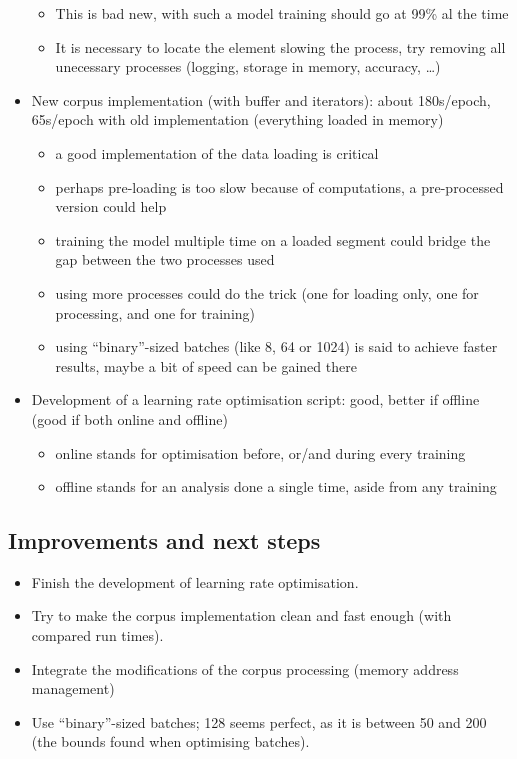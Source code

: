 \begin{itemize}
  \begin{itemize}
  \item
    This is bad new, with such a model training should go at 99\% al the
    time
  \item
    It is necessary to locate the element slowing the process, try
    removing all unecessary processes (logging, storage in memory,
    accuracy, \ldots{})
  \end{itemize}
\item
  New corpus implementation (with buffer and iterators): about
  180s/epoch, 65s/epoch with old implementation (everything loaded in
  memory)

  \begin{itemize}
  \item
    a good implementation of the data loading is critical
  \item
    perhaps pre-loading is too slow because of computations, a
    pre-processed version could help
  \item
    training the model multiple time on a loaded segment could bridge
    the gap between the two processes used
  \item
    using more processes could do the trick (one for loading only, one
    for processing, and one for training)
  \item
    using ``binary''-sized batches (like 8, 64 or 1024) is said to
    achieve faster results, maybe a bit of speed can be gained there
  \end{itemize}
\item
  Development of a learning rate optimisation script: good, better if
  offline (good if both online and offline)

  \begin{itemize}
  \item
    online stands for optimisation before, or/and during every training
  \item
    offline stands for an analysis done a single time, aside from any
    training
  \end{itemize}
\end{itemize}

\subsection{Improvements and next
steps}

\begin{itemize}
\item
  Finish the development of learning rate optimisation.
\item
  Try to make the corpus implementation clean and fast enough (with
  compared run times).
\item
  Integrate the modifications of the corpus processing (memory address
  management)
\item
  Use ``binary''-sized batches; 128 seems perfect, as it is between 50
  and 200 (the bounds found when optimising batches).
\end{itemize}
